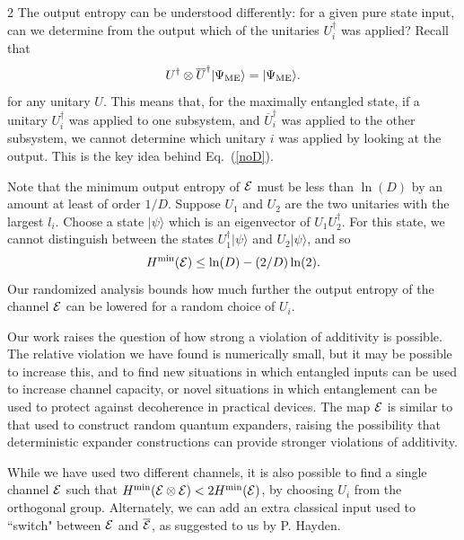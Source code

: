 \documentclass[aps,prl,amsmath,amssymb,amsfonts,superscriptaddress,floatfix]{revtex4}
\newcommand{\ME}{\Psi_{\rm ME}}
\newcommand{\be}{\begin{equation}}
\newcommand{\ee}{\end{equation}}
\begin{document}
\begin{multicols}{2}
The output entropy can be understood differently:
for a given pure state input, can
we determine from the output which of the unitaries $U_i^{\dagger}$ was applied?
Recall that
\be
\label{ind}
U^{\dagger} \otimes \overline U^{\dagger}|\ME\rangle=|\ME\rangle.
\ee
for any unitary $U$.
This means that,
for the maximally entangled state, if a unitary $U_i^{\dagger}$ was applied to
one subsystem, and $\overline U_i^\dagger$ was applied to the other subsystem,
we cannot determine which unitary $i$ was applied by looking at the output.
This is the key idea behind Eq.~(\ref{noD}).

Note that the minimum output entropy of ${\cal E}$ must be less than
$\ln(D)$
by an amount at least of order $1/D$.
Suppose $U_1$ and $U_2$ are the two unitaries with the
largest $l_i$.
Choose 
a state $|\psi\rangle$ which is an eigenvector of $U_1 U_2^{\dagger}$.
For this state, we cannot distinguish between the states $U_1^{\dagger}|\psi\rangle$
and $U_2|\psi\rangle$, and so
\be
H^{\rm min}({\cal E})\leq 
\ln(D)-(2/D) \ln(2).
\ee
Our randomized analysis bounds how much further the output
entropy of the channel ${\cal E}$ can be lowered for a random choice of
$U_i$.

Our work raises the question of how strong a violation of
additivity is possible.  The relative violation we have found is numerically
small, but it may be possible to increase this, and to find new situations
in which entangled inputs can be used to increase channel capacity, or
novel situations in which entanglement can be used to protect against
decoherence in practical devices.
The map ${\cal E}$ is similar to that used\cite{rugqe} to construct random
quantum expanders\cite{qe1,qe2}, raising the possibility that deterministic
expander constructions can provide stronger violations of
additivity.

While we have used two different channels, it is also possible to find a single
channel ${\cal E}$ such that $H^{\rm min}({\cal E} \otimes {\cal E})<2 H^{\rm min}({\cal E})$,
by choosing $U_i$ from the orthogonal group.
Alternately, we can add an extra classical input used to ``switch" between
${\cal E}$ and $\overline {\cal E}$, as suggested to us by P. Hayden.


\end{multicols}
\end{document}
